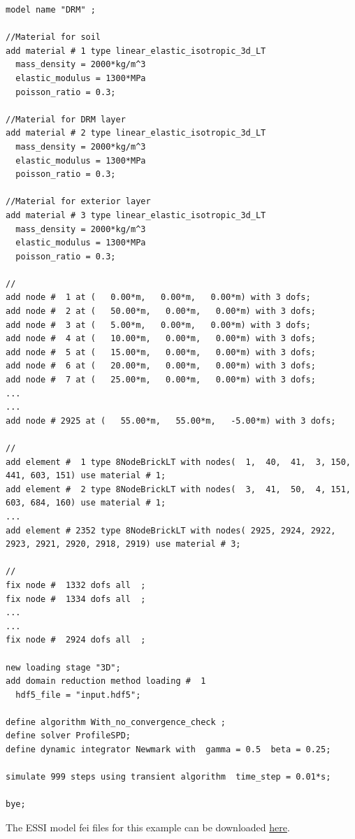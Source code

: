 %
\begin{lstlisting}
model name "DRM" ;

//Material for soil
add material # 1 type linear_elastic_isotropic_3d_LT
  mass_density = 2000*kg/m^3
  elastic_modulus = 1300*MPa
  poisson_ratio = 0.3;

//Material for DRM layer
add material # 2 type linear_elastic_isotropic_3d_LT
  mass_density = 2000*kg/m^3
  elastic_modulus = 1300*MPa
  poisson_ratio = 0.3;

//Material for exterior layer
add material # 3 type linear_elastic_isotropic_3d_LT
  mass_density = 2000*kg/m^3
  elastic_modulus = 1300*MPa
  poisson_ratio = 0.3;

//
add node #  1 at (   0.00*m,   0.00*m,   0.00*m) with 3 dofs;
add node #  2 at (   50.00*m,   0.00*m,   0.00*m) with 3 dofs;
add node #  3 at (   5.00*m,   0.00*m,   0.00*m) with 3 dofs;
add node #  4 at (   10.00*m,   0.00*m,   0.00*m) with 3 dofs;
add node #  5 at (   15.00*m,   0.00*m,   0.00*m) with 3 dofs;
add node #  6 at (   20.00*m,   0.00*m,   0.00*m) with 3 dofs;
add node #  7 at (   25.00*m,   0.00*m,   0.00*m) with 3 dofs;
...
...
add node # 2925 at (   55.00*m,   55.00*m,   -5.00*m) with 3 dofs;

//
add element #  1 type 8NodeBrickLT with nodes(  1,  40,  41,  3, 150, 441, 603, 151) use material # 1;
add element #  2 type 8NodeBrickLT with nodes(  3,  41,  50,  4, 151, 603, 684, 160) use material # 1;
...
add element # 2352 type 8NodeBrickLT with nodes( 2925, 2924, 2922, 2923, 2921, 2920, 2918, 2919) use material # 3;

//
fix node #  1332 dofs all  ;
fix node #  1334 dofs all  ;
...
...
fix node #  2924 dofs all  ;

new loading stage "3D";
add domain reduction method loading #  1
  hdf5_file = "input.hdf5";

define algorithm With_no_convergence_check ;
define solver ProfileSPD;
define dynamic integrator Newmark with  gamma = 0.5  beta = 0.25;

simulate 999 steps using transient algorithm  time_step = 0.01*s;

bye;
\end{lstlisting}

The    ESSI   model   fei   files   for   this   example   can   be   downloaded
\href{https://github.com/BorisJeremic/Real-ESSI-Examples/blob/master/model_fei_file/8NodeBrick_DRM_3D/8NodeBrick_DRM_3D.tgz?raw=true}{here}.

